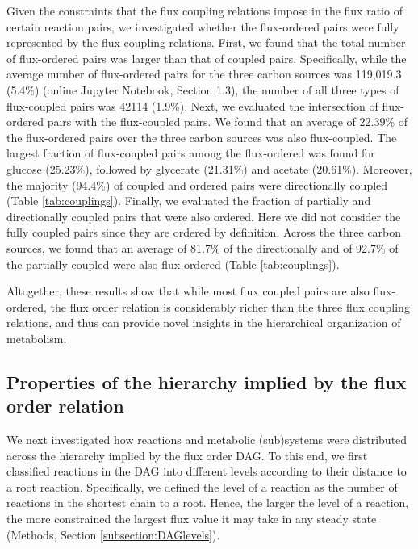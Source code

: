 \documentclass[12pt]{article}
\begin{document}
Given the constraints that the flux coupling relations impose in the flux ratio of certain reaction pairs, we investigated whether the flux-ordered pairs were fully represented by the flux coupling relations. First, we found that the total number of flux-ordered pairs was larger than that of coupled pairs. Specifically, while the average number of flux-ordered pairs for the three carbon sources was 119,019.3 (5.4\%) (online Jupyter Notebook, Section 1.3), the number of all three types of flux-coupled pairs was 42114 (1.9\%). Next, we evaluated the intersection of flux-ordered pairs with the flux-coupled pairs. We found that an average of 22.39\% of the flux-ordered pairs over the three carbon sources was also flux-coupled. The largest fraction of flux-coupled pairs among the flux-ordered was found for glucose (25.23\%), followed by glycerate (21.31\%) and acetate (20.61\%). Moreover, the majority (94.4\%) of coupled and ordered pairs were directionally coupled (Table \ref{tab:couplings}). Finally, we evaluated the fraction of partially and directionally coupled pairs that were also ordered. Here we did not consider the fully coupled pairs since they are ordered by definition. Across the three carbon sources, we found that an average of 81.7\% of the directionally and of 92.7\% of the partially coupled were also flux-ordered (Table \ref{tab:couplings}).

Altogether, these results show that while most flux coupled pairs are also flux-ordered, the flux order relation is considerably richer than the three flux coupling relations, and thus can provide novel insights in the hierarchical organization of metabolism.

\subsection{Properties of the hierarchy implied by the flux order relation}
We next investigated how reactions and metabolic (sub)systems were distributed across the hierarchy implied by the flux order DAG. To this end, we first classified reactions in the DAG into different levels according to their distance to a root reaction. Specifically, we defined the level of a reaction as the number of reactions in the shortest chain to a root. Hence, the larger the level of a reaction, the more constrained the largest flux value it may take in any steady state (Methods, Section \ref{subsection:DAGlevels}).
\end{document}
